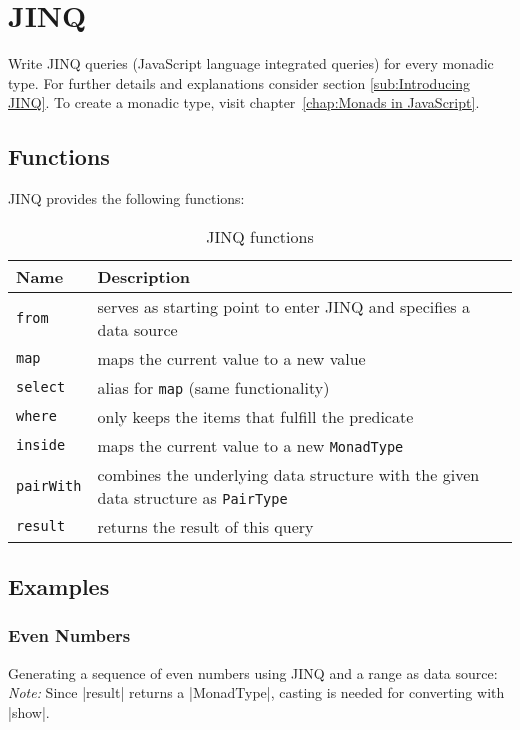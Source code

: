 \section{JINQ} %
\label{sec:API_JINQ}
Write JINQ queries (JavaScript language integrated queries) for every monadic type.
\newline
For further details and explanations consider section \ref{sub:Introducing JINQ}.
\newline
To create a monadic type, visit chapter~\ref{chap:Monads in JavaScript}.

\subsection{Functions}
\label{sub:JINQ_Functions}
JINQ provides the following functions:

\begin{table}[H]
  \centering
  \begin{tabularx}{\textwidth}{| l | X |} \hline
    \textbf{Name}       & \textbf{Description} \\ \hline
    \texttt{from}       & serves as starting point to enter JINQ and specifies a data source \\ \hline 
    \texttt{map}        & maps the current value to a new value \\ \hline 
    \texttt{select}     & alias for \texttt{map} (same functionality) \\ \hline 
    \texttt{where}      & only keeps the items that fulfill the predicate \\ \hline 
    \texttt{inside}     & maps the current value to a new \texttt{MonadType} \\ \hline 
    \texttt{pairWith}   & combines the underlying data structure with the given data structure as \texttt{PairType} \\ \hline 
    \texttt{result}     & returns the result of this query\\ \hline 

  \end{tabularx}
  \caption{JINQ functions}
  \label{tab:jinq_functions}
\end{table}

\subsection{Examples}
\label{sub:JINQ_Examples}

\subsubsection{Even Numbers}
\label{subsub:JINQ_Even Numbers}
Generating a sequence of even numbers using JINQ and a range as data source:
\newline
\textit{Note:} Since |result| returns a |MonadType|, casting is needed
for converting with |show|.

